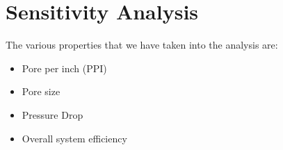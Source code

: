 \documentclass[compileTAMUreport.tex]{subfiles}
\begin{document}
\section{Sensitivity Analysis}
The various properties that we have taken into the analysis are:
\begin{itemize}
\item Pore per inch (PPI)
\item Pore size 
\item Pressure Drop 
\item Overall system efficiency 
\end{itemize}
\end{document}
